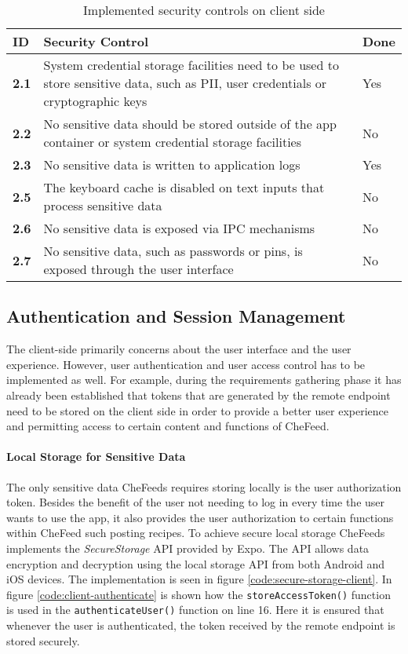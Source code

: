 \begin{table}
    \centering
    \caption{Implemented security controls on client side}
    \label{tab:sec-controls-client}
    \begin{tabulary}{1.0\textwidth}{|L|L|l|}
        \hline
        \textbf{ID} & \textbf{Security Control} & \textbf{Done} \\
        \hline
        \textbf{2.1} & System credential storage facilities need to be used to store sensitive data, such as PII, user credentials or cryptographic keys & Yes \\
        \hline
        \textbf{2.2} & No sensitive data should be stored outside of the app container or system credential storage facilities & No \\
        \hline
        \textbf{2.3} & No sensitive data is written to application logs & Yes \\
        \hline
        \textbf{2.5} & The keyboard cache is disabled on text inputs that process sensitive data & No \\
        \hline
        \textbf{2.6} & No sensitive data is exposed via IPC mechanisms & No \\
        \hline
        \textbf{2.7} & No sensitive data, such as passwords or pins, is exposed through the user interface & No \\
        \hline
    \end{tabulary}
\end{table}

\subsection{Authentication and Session Management}
The client-side primarily concerns about the user interface and the user experience. However, user authentication and user access control has to be implemented as well. For example, during the requirements gathering phase it has already been established that tokens that are generated by the remote endpoint need to be stored on the client side in order to provide a better user experience and permitting access to certain content and functions of CheFeed.

\paragraph{Local Storage for Sensitive Data}
The only sensitive data CheFeeds requires storing locally is the user authorization token. Besides the benefit of the user not needing to log in every time the user wants to use the app, it also provides the user authorization to certain functions within CheFeed such posting recipes. To achieve secure local storage CheFeeds implements the \emph{SecureStorage} API provided by Expo. The API allows data encryption and decryption using the local storage API from both Android and iOS devices. The implementation is seen in figure \ref{code:secure-storage-client}. In figure \ref{code:client-authenticate} is shown how the \verb|storeAccessToken()| function is used in the \verb|authenticateUser()| function on line 16. Here it is ensured that whenever the user is authenticated, the token received by the remote endpoint is stored securely.

